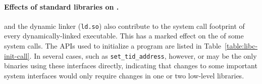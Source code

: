 \paragraph{Effects of standard libraries on \usagemetric{}.} \Libc{} and the dynamic linker ({\tt ld.so}) 
also contribute to the system call footprint of every dynamically-linked executable.
This has a marked effect on the \usagemetric{} of some system calls.
The APIs used to initialize a program  are listed in Table~\ref{table:libc-init-call}.
In several cases, such as {\tt set\_tid\_address}, however, \libc{} or \libpthread{} may be the only binaries using these interfaces directly,
indicating that changes to some important system interfaces would only require changes in one or two low-level libraries.


 



